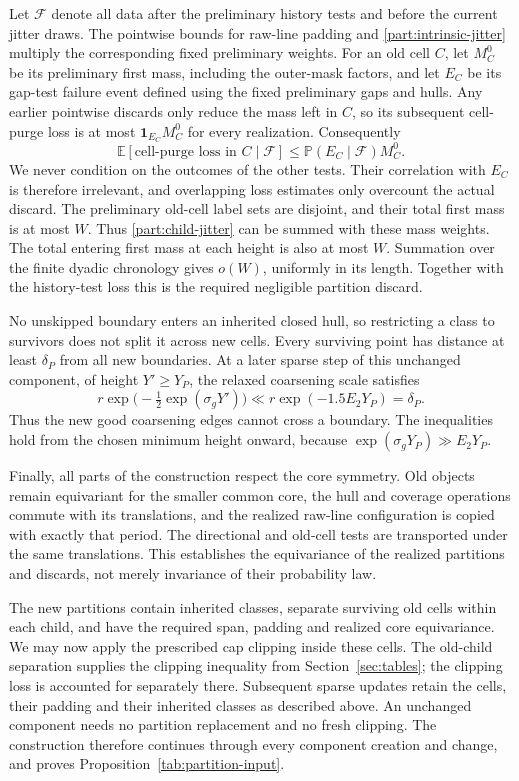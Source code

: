 Let $\mathcal F$ denote all data after the preliminary history tests
and before the current jitter draws.  The pointwise bounds for
raw-line padding and \eqref{part:intrinsic-jitter} multiply the
corresponding fixed preliminary weights.  For an old cell $C$, let
$M_C^0$ be its preliminary first mass, including the outer-mask
factors, and let $E_C$ be its gap-test failure event defined using
the fixed preliminary gaps and hulls.  Any earlier pointwise
discards only reduce the mass left in $C$, so its subsequent
cell-purge loss is at most $\mathbf1_{E_C}M_C^0$ for every
realization.  Consequently
\[
 \mathbb E[\text{cell-purge loss in }C\mid\mathcal F]
 \le \mathbb P(E_C\mid\mathcal F)M_C^0.
\]
We never condition on the outcomes of the other tests.  Their
correlation with $E_C$ is therefore irrelevant, and overlapping
loss estimates only overcount the actual discard.  The preliminary
old-cell label sets are disjoint, and their total first mass is at
most $W$.  Thus \eqref{part:child-jitter} can be summed with these
mass weights.  The total entering first mass at each height is
also at most $W$.  Summation over the finite dyadic chronology gives
$o(W)$, uniformly in its length.  Together with the history-test
loss this is the required negligible partition discard.

No unskipped boundary enters an inherited closed hull, so
restricting a class to survivors does not split it across new
cells.  Every surviving point has distance at least $\delta_P$
from all new boundaries.  At a later sparse step of this
unchanged component, of height $Y'\ge Y_P$, the relaxed
coarsening scale satisfies
\[
 r\exp\bigl(-\tfrac12\exp(\sigma_gY')\bigr)
   \ll r\exp(-1.5E_2Y_P)=\delta_P.
\]
Thus the new good coarsening edges cannot cross a boundary.
The inequalities hold from the chosen minimum height onward,
because $\exp(\sigma_gY_P)\gg E_2Y_P$.

Finally, all parts of the construction respect the core
symmetry.  Old objects remain equivariant for the smaller common
core, the hull and coverage operations commute with its
translations, and the realized raw-line configuration is copied
with exactly that period.  The directional and old-cell tests
are transported under the same translations.  This establishes
the equivariance of the realized partitions and discards, not
merely invariance of their probability law.

The new partitions contain inherited classes, separate surviving
old cells within each child, and have the required span, padding
and realized core equivariance.  We may now apply the prescribed
cap clipping inside these cells.  The old-child separation supplies the
clipping inequality from Section~\ref{sec:tables}; the clipping
loss is accounted for separately there.  Subsequent sparse
updates retain the cells, their padding and their inherited
classes as described above.  An unchanged component needs no
partition replacement and no fresh clipping.  The construction
therefore continues through every component creation and change,
and proves Proposition~\ref{tab:partition-input}.
